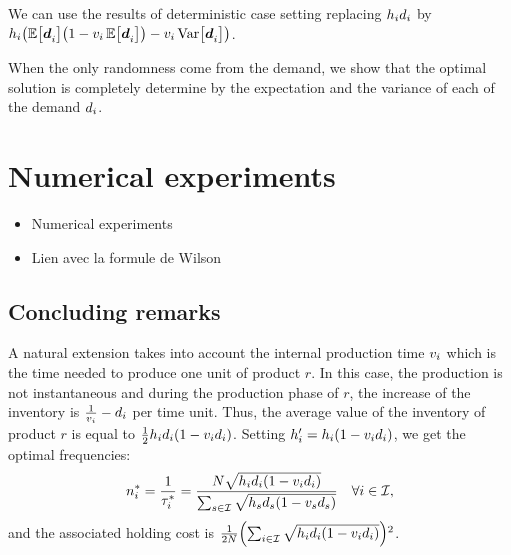We can use the results of deterministic case setting replacing $h_id_i$ by $\holding_i\bracket{\espe\sqbracket{\va\demand_i}\bracket{1-\internal_i\espe\sqbracket{\va\demand_i}}-\internal_i\vari\sqbracket{\va\demand_i}}$.


When the only randomness come from the demand, we show that the optimal solution is completely determine by the expectation and the variance of each of the demand $d_i$.


\section{Numerical experiments}

\begin{itemize}
  \item Numerical experiments
  \item Lien avec la formule de Wilson
\end{itemize}


\subsection{Concluding remarks}



A natural extension takes into account the internal production time $v_i$ which is the time needed to produce one unit of product $r$. In this case, the production is not instantaneous and during the production phase of $r$, the increase of the inventory is $\frac{1}{v_i}-d_i$ per time unit. Thus, the average value of the inventory of product $r$ is equal to $\frac{1}{2}\holding_i\demand_i\bracket{1-\internal_i\demand_i}$. Setting $\holding_i'=\holding_i\bracket{1-\internal_i\demand_i}$, we get the optimal frequencies:
\begin{equation}
  \freq_i^* = \frac{1}{\cover_i^*}
            = \frac{\nbsetups\sqrt{\holding_i\demand_i\bracket{1-\internal_i\demand_i}}}{\sum_{s\in\REF}\sqrt{\holding_s\demand_s\bracket{1-\internal_s\demand_s}}}
            \quad \forall i\in\REF,
\end{equation}
and the associated holding cost is $\frac{1}{2\nbsetups}\bracket{\sum_{i\in\REF}\sqrt{\holding_i\demand_i\bracket{1-\internal_i\demand_i}}}^2$.

